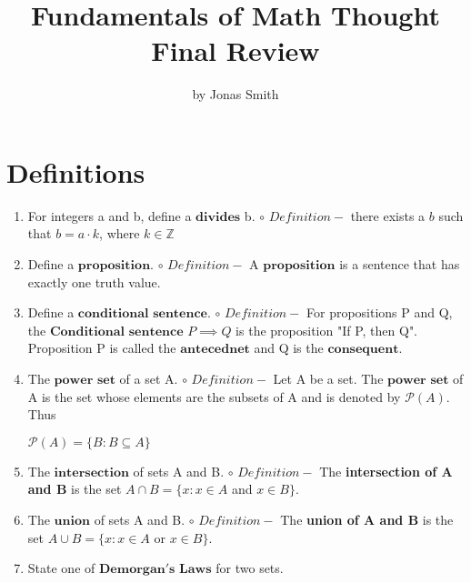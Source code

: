 \documentclass[11pt]{article}
\begin{document}
\author{by Jonas Smith}
\title{Fundamentals of Math Thought Final Review}
\maketitle

\medskip

\section*{Definitions}
\begin{enumerate}
    \item For integers a and b, define a $\mathbf{divides}$ b.
        \newline $\circ$ $Definition - $ there exists a $b$ such that $b=a\cdot k$, where $k \in \mathbb{Z}$
    \item Define a $\mathbf{proposition}$.
        \newline $\circ$ $Definition - $ A $\mathbf{proposition}$ is a sentence that has exactly one truth value.
    \item Define a $\mathbf{conditional}$ $\mathbf{sentence}$.
        \newline $\circ$ $Definition - $ For propositions P and Q, the $\mathbf{Conditional}$ $\mathbf{sentence}$ $P\implies Q$ is the proposition "If P, then Q". Proposition P is called the $\mathbf{antecednet}$ and Q is the $\mathbf{consequent}$.
    \item The $\mathbf{power}$ $\mathbf{set}$ of a set A.
        \newline $\circ$ $Definition - $ Let A be a set. The $\mathbf{power}$ $\mathbf{set}$ of A is the set whose elements are the subsets of A and is denoted by $\mathscr{P}(A)$. Thus
        \begin{center}
            $\mathscr{P}(A) = \{B:B\subseteq A\}$
        \end{center}
    \item The $\mathbf{intersection}$ of sets A and B.
        \newline $\circ$ $Definition - $ The \textbf{intersection of A and B} is the set $A \cap B = \{ x:x \in A$ and $x \in B \}$.
    \item The $\mathbf{union}$ of sets A and B.
        \newline $\circ$ $Definition - $ The \textbf{union of A and B} is the set $A\cup B = \{ x:x \in A$ or $x\in B \}.$
    \item State one of $\mathbf{Demorgan's}$ $\mathbf{Laws}$ for two sets.

\end{enumerate}
\end{document}
